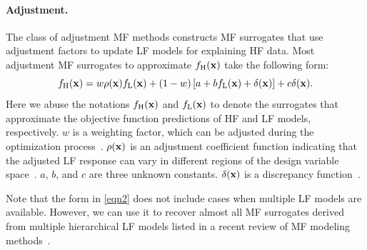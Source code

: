 \documentclass[journal ]{new-aiaa}
\begin{document}
\paragraph{Adjustment.}
The class of adjustment MF methods constructs MF surrogates that use adjustment factors to update LF models for explaining HF data.
Most adjustment MF surrogates to approximate $f_\text{H}({\bf x})$ take the following form:
\begin{equation}\label{eqn2}
	 f_\text{H}({\bf x}) = w \rho({\bf x}) f_\text{L}({\bf x})\\
	+ (1-w)\left[a + b f_\text{L}({\bf x}) + \delta({\bf x})\right]+ c \delta({\bf x}).
\end{equation}
Here we abuse the notations $f_\text{H}({\bf x})$ and $f_\text{L}(\bf x)$ to denote the surrogates that approximate the objective function predictions of HF and LF models, respectively.
$w$ is a weighting factor, which can be adjusted during the optimization process~\citep{Gano2005}.
$\rho({\bf {x}})$ is an adjustment coefficient function indicating that the adjusted LF response can vary in different regions of the design variable space~\citep{Haftka1991}.
$a$, $b$, and $c$ are three unknown constants.
$\delta({\bf{x}})$ is a discrepancy function~\citep{Kennedy2000}.

Note that the form in \cref{eqn2} does not include cases when multiple LF models are available.
However, we can use it to recover almost all MF surrogates derived from multiple hierarchical LF models listed in a recent review of MF modeling methods~\citep{FernandezGodino2016}.
\end{document}
